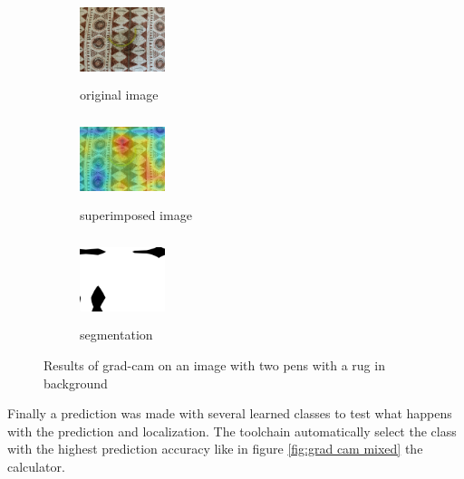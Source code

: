 \documentclass[../ImageClassifier.tex]{subfiles}
\begin{document}
    \begin{figure}[ht!]
        \begin{subfigure}{.32\textwidth}
          \centering
          \includegraphics[height=2.5cm, width=2.5cm]{./attachments/results/12-triangle ruler.jpg}
          \caption{original image}
          \label{fig:original image}
        \end{subfigure}
        \begin{subfigure}{.32\textwidth}
          \centering
          \includegraphics[height=2.5cm, width=2.5cm]{./attachments/results/12-triangle ruler-grad.jpg}
          \caption{superimposed image}
          \label{fig:heatmap activasion}
        \end{subfigure}
        \begin{subfigure}{.32\textwidth}
            \centering
            \includegraphics[height=2.5cm, width=2.5cm]{./attachments/results/12-triangle ruler-seg.jpg}
            \caption{segmentation}
            \label{fig:heatmap resized}
        \end{subfigure}
        \caption{Results of \ac{grad-cam} on an image with two pens with a rug in background}
        \label{fig:grad cam triangle}
    \end{figure}
    \newline
    Finally a prediction was made with several learned classes to test what happens with the prediction and localization.
    The toolchain automatically select the class with the highest prediction accuracy like in figure \ref{fig:grad cam mixed} the calculator.
\end{document}
